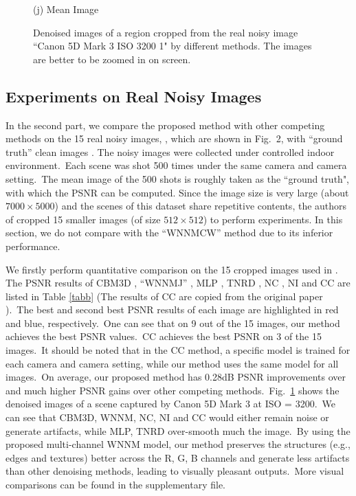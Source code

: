 \documentclass[10pt,twocolumn,letterpaper]{article}
\begin{document}
\begin{figure}
{\begin{minipage}[t]{0.195\textwidth}
{\footnotesize (j) Mean Image \cite{crosschannel2016}}
\end{minipage}
}\vspace{-0.5mm}
\caption{Denoised images of a region cropped from the real noisy image ``Canon 5D Mark 3 ISO 3200 1" \cite{crosschannel2016} by different methods. The images are better to be zoomed in on screen.}
\label{fig7}
\vspace{0.5mm}
\end{figure}

\subsection{Experiments on Real Noisy Images}
In the second part, we compare the proposed method with other competing methods on the 15 real noisy images, , which are shown in Fig.\ 2, with ``ground truth'' clean images \cite{crosschannel2016}. The noisy images were collected under controlled indoor environment.\ Each scene was shot 500 times under the same camera and camera setting.\ The mean image of the 500 shots is roughly taken as the ``ground truth", with which the PSNR can be computed. Since the image size is very large (about $7000\times5000$) and the scenes of this dataset share repetitive contents, the authors of \cite{crosschannel2016} cropped 15 smaller images (of size $512\times512$) to perform experiments. In this section, we do not compare with the ``WNNMCW'' method due to its inferior performance.

We firstly perform quantitative comparison on the 15 cropped images used in \cite{crosschannel2016}. The PSNR results of CBM3D \cite{bm3d}, ``WNNMJ'' \cite{wnnm}, MLP \cite{mlp}, TNRD \cite{chen2015learning}, NC \cite{noiseclinic,ncwebsite}, NI \cite{neatimage} and
CC \cite{crosschannel2016} are listed in Table \ref{tabb} (The results of CC are copied from the original paper \cite{crosschannel2016}).\ The best and second best PSNR results of each image are highlighted in red and blue, respectively.\ One can see that on 9 out of the 15 images, our method achieves the best PSNR values.\ CC achieves the best PSNR on 3 of the 15 images.\ It should be noted that in the CC method, a specific model is trained for each camera and camera setting, while our method uses the same model for all images.\ On average, our proposed method has 0.28dB PSNR improvements over \cite{crosschannel2016} and much higher PSNR gains over other competing methods.\ Fig.\ \ref{fig7} shows the denoised images of a scene captured by Canon 5D Mark 3 at ISO = 3200.\ We can see that CBM3D, WNNM, NC, NI and CC would either remain noise or generate artifacts, while MLP, TNRD over-smooth much the image.\ By using the proposed multi-channel WNNM model, our method preserves the structures (e.g., edges and textures) better across the R, G, B channels and generate less artifacts than other denoising methods, leading to visually pleasant outputs.\ More visual comparisons can be found in the supplementary file.
\end{document}
